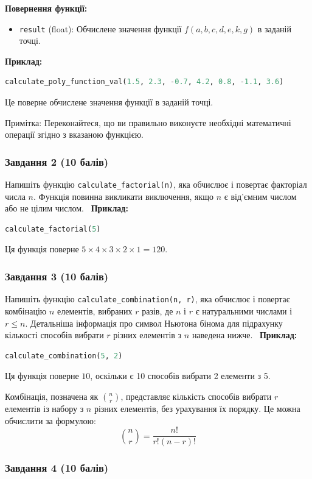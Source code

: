 \documentclass[12pt]{article}
\begin{document}
\textbf{Повернення функції:}
\begin{itemize}
\item \texttt{result} (float): Обчислене значення функції $f(a, b, c, d, e, k, g)$ в заданій точці.
\end{itemize}

\textbf{Приклад:}
\begin{lstlisting}[language=Python]
calculate_poly_function_val(1.5, 2.3, -0.7, 4.2, 0.8, -1.1, 3.6)
\end{lstlisting}
Це поверне обчислене значення функції в заданій точці.

Примітка: Переконайтеся, що ви правильно виконуєте необхідні математичні операції згідно з вказаною функцією.

\subsubsection{Завдання 2 (10 балів)}
Напишіть функцію \texttt{calculate\_factorial(n)}, яка обчислює і повертає факторіал числа $n$. Функція повинна викликати виключення, якщо $n$ є від'ємним числом або не цілим числом. \
\textbf{Приклад:}
\begin{lstlisting}[language=Python]
calculate_factorial(5)
\end{lstlisting}
Ця функція поверне $5 \times 4 \times 3 \times 2 \times 1 = 120$.

\subsubsection{Завдання 3 (10 балів)}
Напишіть функцію \texttt{calculate\_combination(n, r)}, яка обчислює і повертає комбінацію $n$ елементів, вибраних $r$ разів, де $n$ і $r$ є натуральними числами і $r \leq n$. Детальніша інформація про символ Ньютона бінома для підрахунку кількості способів вибрати $r$ різних елементів з $n$ наведена нижче. \
\textbf{Приклад:}
\begin{lstlisting}[language=Python]
calculate_combination(5, 2)
\end{lstlisting}
Ця функція поверне $10$, оскільки є 10 способів вибрати 2 елементи з 5.

Комбінація, позначена як $\binom{n}{r}$, представляє кількість способів вибрати $r$ елементів із набору з $n$ різних елементів, без урахування їх порядку. Це можна обчислити за формулою:
\[
\binom{n}{r} = \frac{n!}{r!(n-r)!}
\]

\subsubsection{Завдання 4 (10 балів)}
\end{document}
